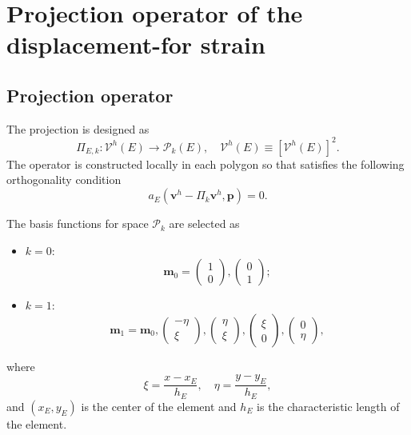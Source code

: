 \documentclass[kulak]{kulakarticle} %
\begin{document}
\section{Projection operator of the displacement-for strain}
\label{r5.s2}
\subsection{Projection operator}
The projection is designed as 
\begin{equation}
    \Pi_{E,k}:\bm{\mathcal{V}}^h(E)\rightarrow\bm{\mathcal{P}}_k(E),\quad \bm{\mathcal{V}}^h(E)\equiv \left[\mathcal{V}^h(E)\right]^2.
\end{equation}
The operator is constructed locally in each polygon so that satisfies the following orthogonality condition 
\begin{equation}
    a_E\left(\bm{v}^h-\Pi_k\bm{v}^h,\bm{p}\right) = 0.
\end{equation}

The basis functions for space $\bm{\mathcal{P}}_k$ are selected as 
\begin{itemize}
    \item $k=0$:
    \begin{equation}
        \bm{m}_0 =
        \begin{pmatrix}
            1 \\ 0
        \end{pmatrix},
        \begin{pmatrix}
            0\\1
        \end{pmatrix};
    \end{equation}
    \item $k=1$:
    \begin{equation}
        \bm{m}_1 =\bm{m}_0,
        \begin{pmatrix}
            -\eta \\ \xi
        \end{pmatrix},
        \begin{pmatrix}
            \eta \\ \xi
        \end{pmatrix},
        \begin{pmatrix}
            \xi \\ 0
        \end{pmatrix},
        \begin{pmatrix}
            0 \\ \eta
        \end{pmatrix},
    \end{equation}
\end{itemize}
where 
\begin{equation}
    \xi = \frac{x-x_E}{h_E},\quad \eta = \frac{y-y_E}{h_E},
\end{equation}
and $(x_E,y_E)$ is the center of the element and $h_E$ is the characteristic length of the element.
\end{document}
